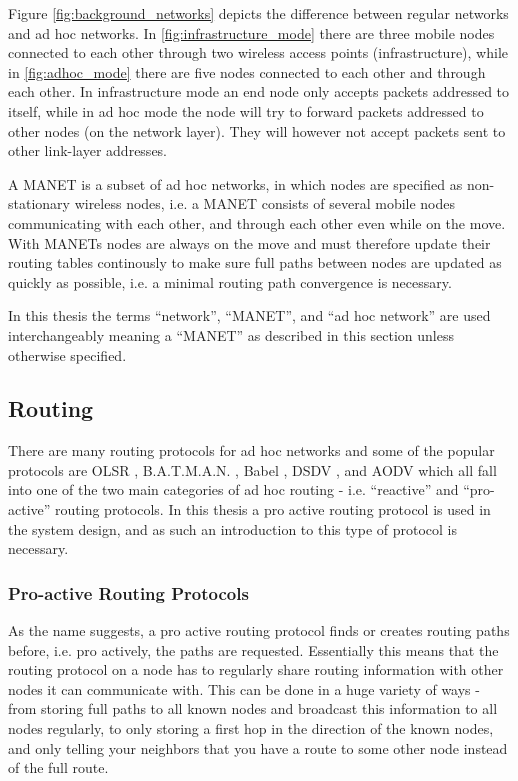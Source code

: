 Figure \ref{fig:background_networks} depicts the difference between regular
networks and ad hoc networks. In \ref{fig:infrastructure_mode} there are three
mobile nodes connected to each other through two wireless access points
(infrastructure), while in \ref{fig:adhoc_mode} there are five nodes connected
to each other and through each other. In infrastructure mode an end node only
accepts packets addressed to itself, while in ad hoc mode the node will try to
forward packets addressed to other nodes (on the network layer). They will
however not accept packets sent to other link-layer addresses.

A \ac{MANET} is a subset of ad hoc networks, in which nodes are specified as
non-stationary wireless nodes, i.e. a \ac{MANET} consists of several mobile
nodes communicating with each other, and through each other even while on the
move. With \acp{MANET} nodes are always on the move and must therefore update
their routing tables continously to make sure full paths between nodes are
updated as quickly as possible, i.e. a minimal routing path convergence is
necessary.

In this thesis the terms ``network'', ``\ac{MANET}'', and ``ad hoc network''
are used interchangeably meaning a ``\ac{MANET}'' as described in this section
unless otherwise specified.

\subsection{Routing}
There are many routing protocols for ad hoc networks and some of the popular
protocols are OLSR \cite{olsr_paper}, B.A.T.M.A.N. \cite{batman_rfc}, Babel
\cite{rfc6126}, DSDV \cite{he2002destination}, and AODV
\cite{Perkins:2003:AHO:RFC3561} which all fall into one of the two main
categories of ad hoc routing - i.e. ``reactive'' and ``pro-active'' routing
protocols. In this thesis a pro active routing protocol is used in the system
design, and as such an introduction to this type of protocol is necessary.

\subsubsection*{Pro-active Routing Protocols}
As the name suggests, a pro active routing protocol finds or creates routing
paths before, i.e. pro actively, the paths are requested. Essentially this means
that the routing protocol on a node has to regularly share routing information
with other nodes it can communicate with. This can be done in a huge variety of
ways - from storing full paths to all known nodes and broadcast this information
to all nodes regularly, to only storing a first hop in the direction of the
known nodes, and only telling your neighbors that you have a route to some other
node instead of the full route.

